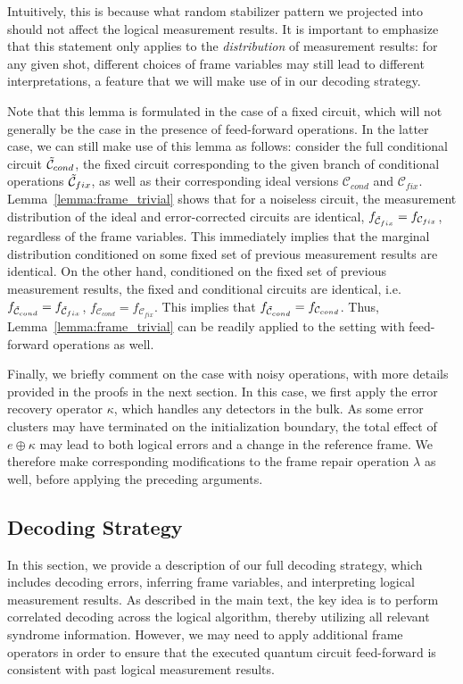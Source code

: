 Intuitively, this is because what random stabilizer pattern we projected into should not affect the logical measurement results.
%
It is important to emphasize that this statement only applies to the \textit{distribution} of measurement results: for any given shot, different choices of frame variables may still lead to different interpretations, a feature that we will make use of in our decoding strategy.

Note that this lemma is formulated in the case of a fixed circuit, which will not generally be the case in the presence of feed-forward operations.
%
In the latter case, we can still make use of this lemma as follows: consider the full conditional circuit $\tilde{\mathcal{C}}_{cond}$, the fixed circuit corresponding to the given branch of conditional operations $\tilde{\mathcal{C}}_{fix}$, as well as their corresponding ideal versions $\mathcal{C}_{cond}$ and $\mathcal{C}_{fix}$.
%
Lemma~\ref{lemma:frame_trivial} shows that for a noiseless circuit, the measurement distribution of the ideal and error-corrected circuits are identical, $f_{\tilde{\mathcal{C}}_{fix}}=f_{\mathcal{C}_{fix}}$, regardless of the frame variables.
%
This immediately implies that the marginal distribution conditioned on some fixed set of previous measurement results are identical.
%
On the other hand, conditioned on the fixed set of previous measurement results, the fixed and conditional circuits are identical, i.e. $f_{\tilde{\mathcal{C}}_{cond}}=f_{\tilde{\mathcal{C}}_{fix}}$, $f_{\mathcal{C}_{cond}}=f_{\mathcal{C}_{fix}}$.
%
This implies that $f_{\tilde{\mathcal{C}}_{cond}}=f_{\mathcal{C}_{cond}}$.
%
Thus, Lemma~\ref{lemma:frame_trivial} can be readily applied to the setting with feed-forward operations as well.

Finally, we briefly comment on the case with noisy operations, with more details provided in the proofs in the next section.
%
In this case, we first apply the error recovery operator $\kappa$, which handles any detectors in the bulk.
%
As some error clusters may have terminated on the initialization boundary, the total effect of $e\oplus\kappa$ may lead to both logical errors and a change in the reference frame.
%
We therefore make corresponding modifications to the frame repair operation $\lambda$ as well, before applying the preceding arguments.

\subsection{Decoding Strategy}
In this section, we provide a description of our full decoding strategy, which includes decoding errors, inferring frame variables, and interpreting logical measurement results.
%
As described in the main text, the key idea is to perform correlated decoding across the logical algorithm, thereby utilizing all relevant syndrome information.
%
However, we may need to apply additional frame operators in order to ensure that the executed quantum circuit feed-forward is consistent with past logical measurement results.

